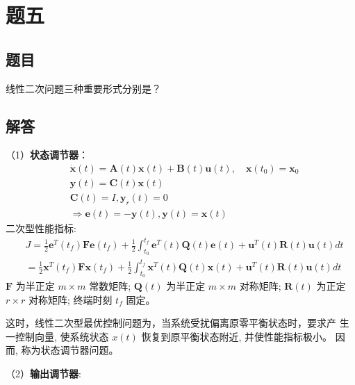 \documentclass[UTF8]{ctexart}
\begin{document}
\section{题五}

  \subsection{题目}
  线性二次问题三种重要形式分别是？
  \subsection{解答}
  \par （1）\textbf{状态调节器}：
  $$
  \begin{aligned}
  &\dot{\boldsymbol{x}}(t)=\boldsymbol{A}(t) \boldsymbol{x}(t)+\boldsymbol{B}(t) \boldsymbol{u}(t), \quad \boldsymbol{x}\left(t_{0}\right)=\boldsymbol{x}_{0} \\
  &\boldsymbol{y}(t)=\boldsymbol{C}(t) \boldsymbol{x}(t) \\
  &\boldsymbol{C}(t)=I, \boldsymbol{y}_{r}(t)=0 \\
  &\Rightarrow \boldsymbol{e}(t)=-\boldsymbol{y}(t), \boldsymbol{y}(t)=\boldsymbol{x}(t)
  \end{aligned}
  $$
  二次型性能指标:
  $$
  \begin{aligned}
  &J=\frac{1}{2} \boldsymbol{e}^{T}\left(t_{f}\right) \boldsymbol{F e}\left(t_{f}\right)+\frac{1}{2} \int_{t_{0}}^{t_{f}} \boldsymbol{e}^{T}(t) \boldsymbol{Q}(t) \boldsymbol{e}(t)+\boldsymbol{u}^{T}(t) \boldsymbol{R}(t) \boldsymbol{u}(t) d t \\
  &=\frac{1}{2} \boldsymbol{x}^{T}\left(t_{f}\right) \boldsymbol{F} \boldsymbol{x}\left(t_{f}\right)+\frac{1}{2} \int_{t_{0}}^{t_{f}} \boldsymbol{x}^{T}(t) \boldsymbol{Q}(t) \boldsymbol{x}(t)+\boldsymbol{u}^{T}(t) \boldsymbol{R}(t) \boldsymbol{u}(t) d t
  \end{aligned}
  $$
  $\boldsymbol{F}$ 为半正定 $m \times m$ 常数矩阵; $\boldsymbol{Q}(t)$ 为半正定 $m \times m$ 对称矩阵; $\boldsymbol{R}(t)$ 为正定 $r \times r$ 对称矩阵; 终端时刻 $t_{f}$ 固定。
  
  这时，线性二次型最优控制问题为，当系统受扰偏离原零平衡状态时，要求产 生一控制向量, 使系统状态 $x(t)$ 恢复到原平衡状态附近, 并使性能指标极小。 因而, 称为状态调节器问题。
  \par （2）\textbf{输出调节器}: 
  
\end{document}

